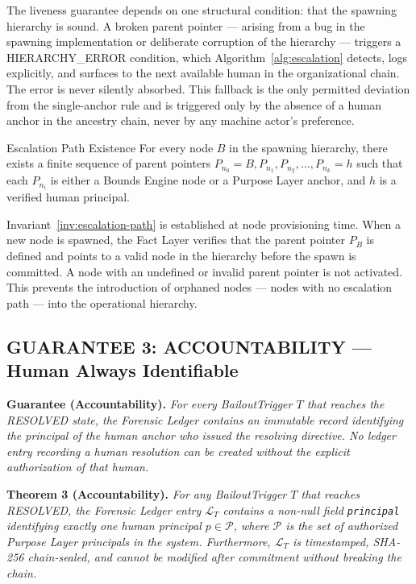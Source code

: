 \bigskip

The liveness guarantee depends on one structural condition: that the spawning hierarchy is sound. A broken parent pointer — arising from a bug in the spawning implementation or deliberate corruption of the hierarchy — triggers a HIERARCHY\_ERROR condition, which Algorithm~\ref{alg:escalation} detects, logs explicitly, and surfaces to the next available human in the organizational chain. The error is never silently absorbed. This fallback is the only permitted deviation from the single-anchor rule and is triggered only by the absence of a human anchor in the ancestry chain, never by any machine actor's preference.

\begin{invariant}{Escalation Path Existence}
\label{inv:escalation-path}
For every node $B$ in the spawning hierarchy, there exists a finite sequence of parent pointers $P_{n_0} = B, P_{n_1}, P_{n_2}, \ldots, P_{n_k} = h$ such that each $P_{n_i}$ is either a Bounds Engine node or a Purpose Layer anchor, and $h$ is a verified human principal.
\end{invariant}

Invariant~\ref{inv:escalation-path} is established at node provisioning time. When a new node is spawned, the Fact Layer verifies that the parent pointer $P_B$ is defined and points to a valid node in the hierarchy before the spawn is committed. A node with an undefined or invalid parent pointer is not activated. This prevents the introduction of orphaned nodes — nodes with no escalation path — into the operational hierarchy.

\subsection{GUARANTEE 3: ACCOUNTABILITY — Human Always Identifiable}
\bigskip

\begin{minipage}{\linewidth}
\textbf{Guarantee (Accountability).} \textit{For every BailoutTrigger $T$ that reaches the RESOLVED state, the Forensic Ledger contains an immutable record identifying the principal of the human anchor who issued the resolving directive. No ledger entry recording a human resolution can be created without the explicit authorization of that human.}
\end{minipage}

\bigskip

\noindent\textbf{Theorem 3 (Accountability).}
\textit{For any BailoutTrigger $T$ that reaches RESOLVED, the Forensic Ledger entry $\mathcal{L}_T$ contains a non-null field \texttt{principal} identifying exactly one human principal $p \in \mathcal{P}$, where $\mathcal{P}$ is the set of authorized Purpose Layer principals in the system. Furthermore, $\mathcal{L}_T$ is timestamped, SHA-256 chain-sealed, and cannot be modified after commitment without breaking the chain.}

